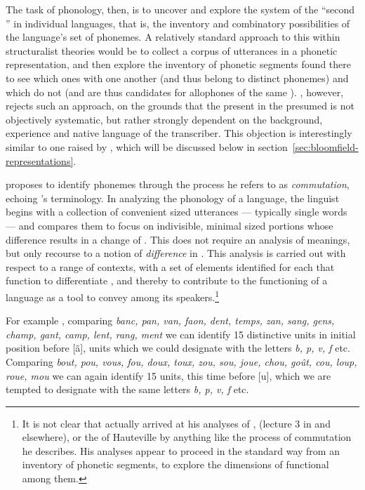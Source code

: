 The task of phonology, then, is to uncover and explore the system of
the ``second '' in individual languages, that is, the
inventory and combinatory possibilities of the language's set of
phonemes. A relatively standard approach to this within structuralist
theories would be to collect a corpus of utterances in a phonetic
representation, and then explore the inventory of phonetic segments
found there to see which ones  with one another (and thus belong
to distinct phonemes) and which do not (and are thus candidates for
allophones of the same ). {\Martinet}, however, rejects such an
approach, on the grounds that the  present in the presumed
 is not objectively systematic, but rather
strongly dependent on the background, experience and native language
of the transcriber. This objection is interestingly similar to one
raised by {\Bloomfield}, which will be discussed below in
section~\ref{sec:bloomfield-representations}.

{\Martinet} proposes to identify phonemes through the process he refers
to as \emph{commutation}, echoing {\Hjelmslev}'s terminology. In
analyzing the phonology of a language, the linguist begins with a
collection of convenient sized utterances --- typically single words
--- and compares them to focus on indivisible, minimal sized portions
whose difference results in a change of . This does not require
an analysis of meanings, but only recourse to a notion of
\emph{difference} in . This analysis is carried out with
respect to a range of contexts, with a set of elements identified for
each that function to differentiate , and thereby to contribute
to the functioning of a language as a tool to convey  among its
speakers.\footnote{It is not clear that {\Martinet} actually arrived at
  his analyses of  \citep{martinet37:danish},  (lecture 3
  in \citealt{martinet49:functional.phonetics} and elsewhere), or the
   of Hauteville \citep{martinet56:description} by
  anything like the process of commutation he describes. His analyses
  appear to proceed in the standard way from an inventory of phonetic
  segments, to explore the dimensions of functional  among
  them.}

For example \citep[63ff.]{martinet65:synchronique}, comparing 
\emph{banc, pan, van, faon, dent, temps, zan, sang, gens, champ, gant,
camp, lent, rang, ment} we can identify 15 distinctive units in
initial position before {[ã]}, units which we could designate with the
letters \emph{b, p, v, f} etc. Comparing \emph{bout, pou, vous, fou,
  doux, toux, zou, sou, joue, chou, goût, cou, loup, roue, mou} we can
again identify 15 units, this time before {[u]}, which we are tempted
to designate with the same letters \emph{b, p, v, f} etc.

